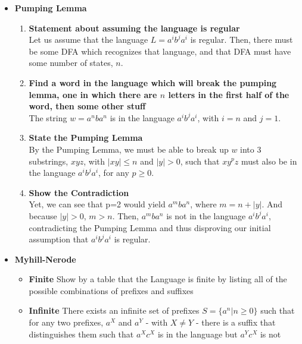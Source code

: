 \begin{itemize}
\item \textbf{Pumping Lemma}
\begin{enumerate}
	\item \textbf{Statement about assuming the language is regular}
	\\Let us assume that the language $L = a^ib^ja^i$ is regular. Then, there must be some DFA which recognizes that language, and that DFA must have some number of states, $n$.
	\item\textbf{ Find a word in the language which will break the pumping lemma, one in which there are $n$ letters in the first half of the word, then some other stuff}
	\\ The string $w = a^nba^n$ is in the language $a^ib^ja^i$, with $i=n$ and $j=1$.
	\item \textbf{State the Pumping Lemma}
	\\ By the Pumping Lemma, we must be able to break up $w$ into 3 substrings, $xyz$, with $|xy| \leq n$ and $|y|>0$, such that $xy^pz$ must also be in the language $a^ib^ja^i$, for any $p \geq 0$.
	\item \textbf{Show the Contradiction}
	\\ Yet, we can see that p=2 would yield $a^mba^n$, where $m=n+|y|$. And because $|y|>0$, $m>n$. Then, $a^mba^n$ is not in the language $a^ib^ja^i$, contradicting the Pumping Lemma and thus disproving our initial assumption that $a^ib^ja^i$ is regular.
\end{enumerate}

\item \textbf{Myhill-Nerode}
\begin{itemize}
	\item \textbf{Finite}
	Show by a table that the Language is finite by listing all of the possible combinations of prefixes and suffixes
	\item \textbf{Infinite}
	There exists an infinite set of prefixes $S = \{a^n | n \geq 0\}$ such that for any two prefixes, $a^X$ and $a^Y$ - with $X \neq Y$ - there is a suffix that distinguishes them such that $a^Xc^X$ is in the language but $a^Yc^X$ is not
\end{itemize}


\end{itemize}


